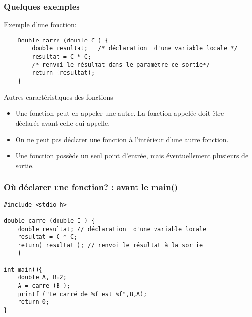 \documentclass{beamer}
\begin{document}
  
 
\begin{frame}[fragile]
\frametitle{Quelques exemples}
Exemple d'une fonction:
\begin{verbatim}
    Double carre (double C ) {      
        double resultat;   /* déclaration  d'une variable locale */
        resultat = C * C;
        /* renvoi le résultat dans le paramètre de sortie*/
        return (resultat);
    }
\end{verbatim}
    Autres caractéristiques des fonctions :
\begin{itemize}
\item Une fonction peut en appeler une autre. La fonction appelée doit être déclarée avant celle qui appelle.
\item On ne peut pas déclarer une fonction à l'intérieur d'une autre fonction.
\item Une fonction possède un seul point d'entrée, mais éventuellement plusieurs de sortie. 
\end{itemize}

\end{frame}
  
  
 

\begin{frame}[fragile]
\frametitle{Où déclarer  une fonction? : avant le main()}
\begin{verbatim}
#include <stdio.h>

double carre (double C ) {      
    double resultat; // déclaration  d'une variable locale
    resultat = C * C;
    return( resultat ); // renvoi le résultat à la sortie
    }
    
int main(){
 	double A, B=2;
  	A = carre (B );
 	printf ("Le carré de %f est %f",B,A);
    return 0;
}
\end{verbatim}
\end{frame}
\end{document}
